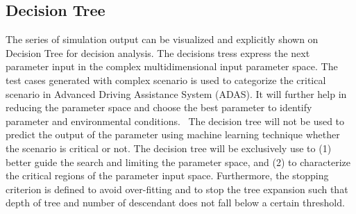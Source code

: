 
\subsection{Decision Tree}
The series of simulation output can be visualized and explicitly shown on Decision Tree for decision analysis\cite{abdessalem2018testing}. The decisions tress express the next parameter input in the complex multidimensional input parameter space. The test cases generated with complex scenario is used to categorize the critical scenario in Advanced Driving Assistance System (ADAS). It will further help in reducing the parameter space and choose the best parameter to identify parameter and environmental conditions. \
The decision tree will not be used to predict the output of the parameter using machine learning technique whether the scenario is critical or not. The decision tree will be exclusively use to (1) better guide the search and limiting the parameter space, and (2) to characterize
the critical regions of the parameter input space. Furthermore, the stopping criterion is defined to avoid over-fitting and to stop the tree expansion such that depth of tree and number of descendant does not fall below a certain threshold. 
